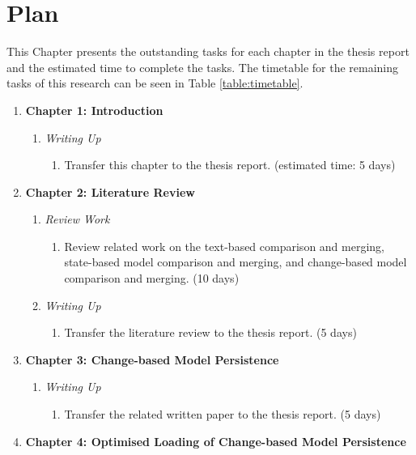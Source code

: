 \documentclass[12pt, a4paper]{report} \usepackage[titletoc]{appendix}
\begin{document}
\chapter{Plan}
\label{ch:plan}
This Chapter presents the outstanding tasks for each chapter in the thesis report and the estimated time to complete the tasks. The timetable for the remaining tasks of this research can be seen in Table \ref{table:timetable}.

\begin{enumerate}
    \setlength\itemsep{0pt}
    \item \textbf{Chapter 1: Introduction}
    \begin{enumerate}
        \item \textit{Writing Up}
        \begin{enumerate}
            \item Transfer this chapter to the thesis report. (estimated time: 5 days)
        \end{enumerate}
    \end{enumerate}
    \item \textbf{Chapter 2: Literature Review}
    \begin{enumerate}
        \item \textit{Review Work}
        \begin{enumerate}
            \item Review related work on the text-based comparison and merging, state-based model comparison and merging, and change-based model  comparison and merging. (10 days)
        \end{enumerate}
        \item \textit{Writing Up}
        \begin{enumerate}
            \item Transfer the literature review to the thesis report. (5 days)
        \end{enumerate}
    \end{enumerate}
    \item \textbf{Chapter 3: Change-based Model Persistence}
    \begin{enumerate}
        \item \textit{Writing Up}
        \begin{enumerate}
            \item Transfer the related written paper to the thesis report. (5 days)
        \end{enumerate}
    \end{enumerate}
    \item \textbf{Chapter 4: Optimised Loading of Change-based Model Persistence}

\end{enumerate}
\end{document}
